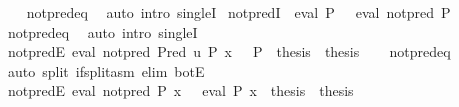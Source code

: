 \begin{isabellebody}
%
\isadelimproof
\ \ %
\endisadelimproof
%
\isatagproof
{}\isamarkupfalse%
\ not{\isacharunderscore}{\kern0pt}pred{\isacharunderscore}{\kern0pt}eq\ \isamarkupfalse%
\ {\isacharparenleft}{\kern0pt}auto\ intro{\isacharcolon}{\kern0pt}\ singleI{\isacharparenright}{\kern0pt}%
\endisatagproof
{\isafoldproof}%
%
\isadelimproof
\isanewline
%
\endisadelimproof
\isanewline
{}\isamarkupfalse%
\ not{\isacharunderscore}{\kern0pt}predI{\isacharprime}{\kern0pt}{\isacharcolon}{\kern0pt}\ {\isachardoublequoteopen}{\isasymnot}\ eval\ P\ {\isacharparenleft}{\kern0pt}{\isacharparenright}{\kern0pt}\ {\isasymLongrightarrow}\ eval\ {\isacharparenleft}{\kern0pt}not{\isacharunderscore}{\kern0pt}pred\ P{\isacharparenright}{\kern0pt}\ {\isacharparenleft}{\kern0pt}{\isacharparenright}{\kern0pt}{\isachardoublequoteclose}\isanewline
%
\isadelimproof
\ \ %
\endisadelimproof
%
\isatagproof
{}\isamarkupfalse%
\ not{\isacharunderscore}{\kern0pt}pred{\isacharunderscore}{\kern0pt}eq\ \isamarkupfalse%
\ {\isacharparenleft}{\kern0pt}auto\ intro{\isacharcolon}{\kern0pt}\ singleI{\isacharparenright}{\kern0pt}%
\endisatagproof
{\isafoldproof}%
%
\isadelimproof
\isanewline
%
\endisadelimproof
\isanewline
{}\isamarkupfalse%
\ not{\isacharunderscore}{\kern0pt}predE{\isacharcolon}{\kern0pt}\ {\isachardoublequoteopen}eval\ {\isacharparenleft}{\kern0pt}not{\isacharunderscore}{\kern0pt}pred\ {\isacharparenleft}{\kern0pt}Pred\ {\isacharparenleft}{\kern0pt}{\isasymlambda}u{\isachardot}{\kern0pt}\ P{\isacharparenright}{\kern0pt}{\isacharparenright}{\kern0pt}{\isacharparenright}{\kern0pt}\ x\ {\isasymLongrightarrow}\ {\isacharparenleft}{\kern0pt}{\isasymnot}\ P\ {\isasymLongrightarrow}\ thesis{\isacharparenright}{\kern0pt}\ {\isasymLongrightarrow}\ thesis{\isachardoublequoteclose}\isanewline
%
\isadelimproof
\ \ %
\endisadelimproof
%
\isatagproof
{}\isamarkupfalse%
\ not{\isacharunderscore}{\kern0pt}pred{\isacharunderscore}{\kern0pt}eq\isanewline
\ \ \isamarkupfalse%
\ {\isacharparenleft}{\kern0pt}auto\ split{\isacharcolon}{\kern0pt}\ if{\isacharunderscore}{\kern0pt}split{\isacharunderscore}{\kern0pt}asm\ elim{\isacharcolon}{\kern0pt}\ botE{\isacharparenright}{\kern0pt}%
\endisatagproof
{\isafoldproof}%
%
\isadelimproof
\isanewline
%
\endisadelimproof
\isanewline
{}\isamarkupfalse%
\ not{\isacharunderscore}{\kern0pt}predE{\isacharprime}{\kern0pt}{\isacharcolon}{\kern0pt}\ {\isachardoublequoteopen}eval\ {\isacharparenleft}{\kern0pt}not{\isacharunderscore}{\kern0pt}pred\ P{\isacharparenright}{\kern0pt}\ x\ {\isasymLongrightarrow}\ {\isacharparenleft}{\kern0pt}{\isasymnot}\ eval\ P\ x\ {\isasymLongrightarrow}\ thesis{\isacharparenright}{\kern0pt}\ {\isasymLongrightarrow}\ thesis{\isachardoublequoteclose}\isanewline

\end{isabellebody}
